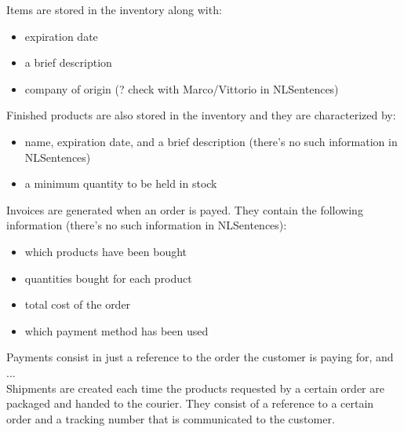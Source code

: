 Items are stored in the inventory along with:
\begin{itemize}
	\item expiration date
	\item a brief description
	\item company of origin (? check with Marco/Vittorio in NLSentences)
\end{itemize}
Finished products are also stored in the inventory and they are characterized by:
\begin{itemize}
	\item name, expiration date, and a brief description (there's no such information in NLSentences)
	\item a minimum quantity to be held in stock
\end{itemize}
Invoices are generated when an order is payed. They contain the following information (there's no such information in NLSentences):
\begin{itemize}
	\item which products have been bought
	\item quantities bought for each product
	\item total cost of the order
	\item which payment method has been used
\end{itemize}
Payments consist in just a reference to the order the customer is paying for, and ...\\
Shipments are created each time the products requested by a certain order are packaged and handed to the courier. They consist of a reference to a certain order and a tracking number that is communicated to the customer.